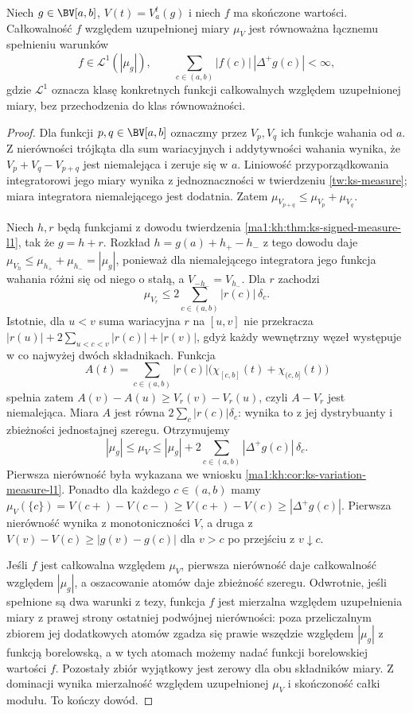 \begin{twierdzenie}\label{ma1:kh:thm:ks-measure-criteria-equivalence}
Niech $g\in\BV[a,b]$, $V(t)=V_a^t(g)$ i niech $f$ ma skończone wartości. Całkowalność $f$ względem uzupełnionej miary $\mu_V$ jest równoważna łącznemu spełnieniu warunków
\[
 f\in\mathcal L^1(|\mu_g|),\qquad
 \sum_{c\in(a,b)}|f(c)|\,|\Delta^+g(c)|<\infty,
\]
gdzie $\mathcal L^1$ oznacza klasę konkretnych funkcji całkowalnych względem uzupełnionej miary, bez przechodzenia do klas równoważności.
\end{twierdzenie}
\begin{proof}
Dla funkcji $p,q\in\BV[a,b]$ oznaczmy przez $V_p,V_q$ ich funkcje wahania od $a$. Z nierówności trójkąta dla sum wariacyjnych i addytywności wahania wynika, że $V_p+V_q-V_{p+q}$ jest niemalejąca i zeruje się w $a$. Liniowość przyporządkowania integratorowi jego miary wynika z jednoznaczności w twierdzeniu \ref{tw:ks-measure}; miara integratora niemalejącego jest dodatnia. Zatem $\mu_{V_{p+q}}\le\mu_{V_p}+\mu_{V_q}$.

Niech $h,r$ będą funkcjami z dowodu twierdzenia \ref{ma1:kh:thm:ks-signed-measure-l1}, tak że $g=h+r$. Rozkład $h=g(a)+h_+-h_-$ z tego dowodu daje $\mu_{V_h}\le\mu_{h_+}+\mu_{h_-}=|\mu_g|$, ponieważ dla niemalejącego integratora jego funkcja wahania różni się od niego o stałą, a $V_{-h_-}=V_{h_-}$. Dla $r$ zachodzi
\[
 \mu_{V_r}\le 2\sum_{c\in(a,b)}|r(c)|\,\delta_c.
\]
Istotnie, dla $u<v$ suma wariacyjna $r$ na $[u,v]$ nie przekracza $|r(u)|+2\sum_{u<c<v}|r(c)|+|r(v)|$, gdyż każdy wewnętrzny węzeł występuje w co najwyżej dwóch składnikach. Funkcja
\[
 A(t)=\sum_{c\in(a,b)}|r(c)|\bigl(\chi_{[c,b]}(t)+\chi_{(c,b]}(t)\bigr)
\]
spełnia zatem $A(v)-A(u)\ge V_r(v)-V_r(u)$, czyli $A-V_r$ jest niemalejąca. Miara $A$ jest równa $2\sum_c|r(c)|\delta_c$: wynika to z jej dystrybuanty i zbieżności jednostajnej szeregu. Otrzymujemy
\[
 |\mu_g|\le\mu_V\le|\mu_g|+2\sum_{c\in(a,b)}|\Delta^+g(c)|\,\delta_c.
\]
Pierwsza nierówność była wykazana we wniosku \ref{ma1:kh:cor:ks-variation-measure-l1}. Ponadto dla każdego $c\in(a,b)$ mamy $\mu_V(\{c\})=V(c+)-V(c-)\ge V(c+)-V(c)\ge|\Delta^+g(c)|$. Pierwsza nierówność wynika z monotoniczności $V$, a druga z $V(v)-V(c)\ge|g(v)-g(c)|$ dla $v>c$ po przejściu z $v\downarrow c$.

Jeśli $f$ jest całkowalna względem $\mu_V$, pierwsza nierówność daje całkowalność względem $|\mu_g|$, a oszacowanie atomów daje zbieżność szeregu. Odwrotnie, jeśli spełnione są dwa warunki z tezy, funkcja $f$ jest mierzalna względem uzupełnienia miary z prawej strony ostatniej podwójnej nierówności: poza przeliczalnym zbiorem jej dodatkowych atomów zgadza się prawie wszędzie względem $|\mu_g|$ z funkcją borelowską, a w tych atomach możemy nadać funkcji borelowskiej wartości $f$. Pozostały zbiór wyjątkowy jest zerowy dla obu składników miary. Z dominacji wynika mierzalność względem uzupełnionej $\mu_V$ i skończoność całki modułu. To kończy dowód.
\end{proof}
